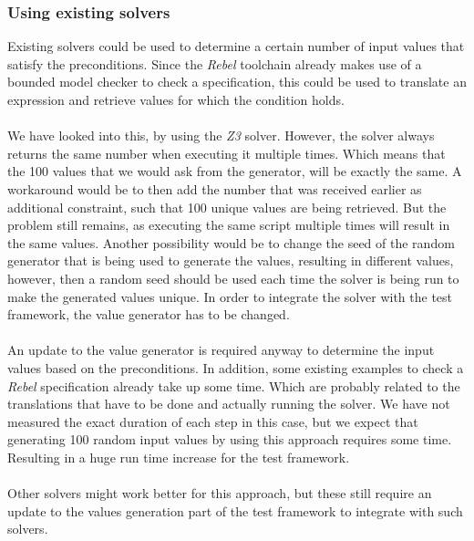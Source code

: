 \subsubsection{Using existing solvers}
Existing solvers could be used to determine a certain number of input values
that satisfy the preconditions. Since the \textit{Rebel} toolchain already makes
use of a bounded model checker to check a specification, this could be used to
translate an expression and retrieve values for which the condition holds.\\
\\
We have looked into this, by using the \textit{Z3} solver. However, the solver
always returns the same number when executing it multiple times. Which means
that the 100 values that we would ask from the generator, will be exactly the
same. A workaround would be to then add the number that was received earlier as
additional constraint, such that 100 unique values are being retrieved. But the
problem still remains, as executing the same script multiple times will result in
the same values. Another possibility would be to change the seed of the random generator that is being
used to generate the values, resulting in different values, however, then a random seed should be used each time the solver is being run to make the generated values unique. In order to integrate the solver with the test framework, the value generator has to be changed.\\
\\
An update to the value generator is required anyway to determine the input values based on the preconditions. In addition, some existing examples to check a \textit{Rebel} specification already take up some time. Which are probably related to the translations that have to be done and actually running the solver. We have not measured the exact duration of each step in this case, but we expect that generating 100 random input values by using this approach requires some time. Resulting in a huge run time increase for the test framework.\\
\\
Other solvers might work better for this approach, but these still require an update to the values generation part of the test framework to integrate with such solvers.


%

